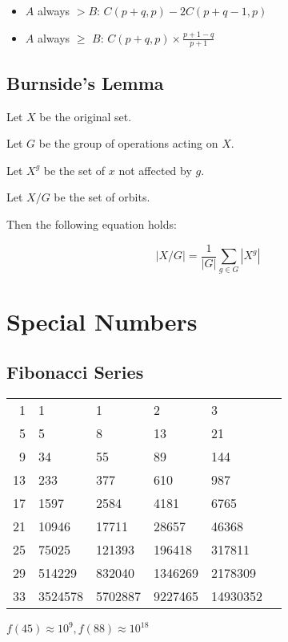 \documentclass[a4paper,10pt,twocolumn,oneside]{article}
\begin{document}
\begin{itemize}
    \item $A$ always $> B$: $C(p+q, p) - 2 C(p+q-1, p)$
    \item $A$ always $\geq$ $B$: $C(p+q, p) \times \frac{p + 1 - q}{p + 1}$
\end{itemize}


\subsection{Burnside's Lemma}
{\normalsize
Let $X$ be the original set.

Let $G$ be the group of operations acting on $X$.

Let $X^g$ be the set of $x$ not affected by $g$.

Let $X/G$ be the set of orbits.

Then the following equation holds:

$$
|X/G| = \frac{1}{|G|} \sum_{g \in G} |X^g|
$$
}

\section{Special Numbers}

\subsection{Fibonacci Series}

{\normalsize
\begin{center}
    \begin{tabular}{r|lllll}
        1 & 1 & 1 & 2 & 3 \\
        5 & 5 & 8 & 13 & 21 \\
        9 & 34 & 55 & 89 & 144 \\
        13 & 233 & 377 & 610 & 987 \\
        17 & 1597 & 2584 & 4181 & 6765 \\
        21 & 10946 & 17711 & 28657 & 46368 \\
        25 & 75025 & 121393 & 196418 & 317811 \\
        29 & 514229 & 832040 & 1346269 & 2178309 \\
        33 & 3524578 & 5702887 & 9227465 & 14930352
    \end{tabular}
\end{center}
\noindent
$f(45) \approx 10^9, f(88) \approx 10^{18}$
}
\end{document}
